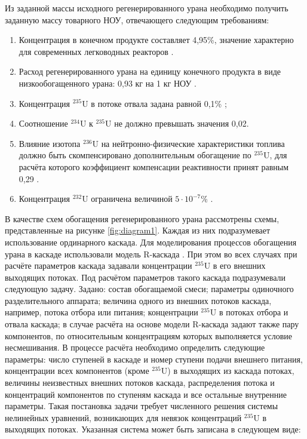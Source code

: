 Из заданной массы исходного регенерированного урана необходимо получить заданную массу товарного НОУ, отвечающего следующим требованиям:

\begin{enumerate}
  \item Концентрация в конечном продукте составляет 4,95\%, значение характерно для современных легководных реакторов \cite{solovevaCennostiOYaTKak2019}.
  \item Расход регенерированного урана на единицу конечного продукта в виде низкообогащенного урана: 0,93 кг на 1 кг НОУ \cite{smirnovApplyingEnrichmentCapacities2018}.
  \item Концентрация $^{235}$U в потоке отвала задана равной 0,1\% \cite{smirnovEvolutionIsotopicComposition2012};
  \item Соотношение $^{234}$U к $^{235}$U не должно превышать значения 0,02.
  \item Влияние изотопа $^{236}$U на нейтронно-физические характеристики топлива должно быть скомпенсировано дополнительным обогащение по $^{235}$U, для расчёта которого коэффициент компенсации реактивности принят равным 0,29 \cite{smirnovApplyingEnrichmentCapacities2018}.
  \item Концентрация $^{232}$U ограничена величиной $5\cdot10^{-7}$\% \cite{smirnovApplyingEnrichmentCapacities2018}.
\end{enumerate}

В качестве схем обогащения регенерированного урана рассмотрены схемы, представленные на рисунке \ref{fig:diagram1}.
Каждая из них подразумевает использование ординарного каскада. Для моделирования процессов обогащения урана в каскаде использовали модель R-каскада \cite{sulaberidzeTeoriyaKaskadovDlya2011}. При этом во всех случаях при расчёте параметров каскада задавали концентрации $^{235}$U в его внешних выходящих потоках. Под расчётом параметров такого каскада подразумевали следующую задачу. 
Задано: состав обогащаемой смеси; параметры одиночного разделительного аппарата; величина одного из внешних потоков каскада, например, потока отбора или питания; концентрации $^{235}$U в потоках отбора и отвала каскада; в случае расчёта на основе модели R-каскада задают также пару компонентов, по относительным концентрациям которых выполняется условие несмешивания.
В процессе расчёта необходимо определить следующие параметры: число ступеней в каскаде и номер ступени подачи внешнего питания, концентрации всех компонентов (кроме $^{235}$U) в выходящих из каскада потоках, величины неизвестных внешних потоков каскада, распределения потока и концентраций компонентов по ступеням каскада и все остальные внутренние параметры. 
Такая постановка задачи требует численного решения системы нелинейных уравнений, возникающих для невязок концентраций $^{235}$U в выходящих потоках. Указанная система может быть записана в следующем виде: 

